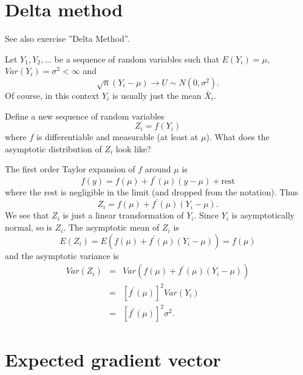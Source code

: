 \documentclass{article}
\begin{document}
\section{Delta method}

See also exercise ''Delta Method''.

Let $Y_{1},Y_{2},\ldots $ be a sequence of random variables such that $E(Y_i)=\mu$, $Var(Y_i) = \sigma^2 < \infty $ and
\begin{equation*}
\sqrt{n}\left( Y_{i}-\mu \right) \rightarrow U\sim N(0,\sigma ^{2}).
\end{equation*}
Of course, in this context $Y_{i}$ is usually just the mean $\bar{X}_{i}$.

Define a new sequence of random variables
\begin{equation*}
Z_{i}=f(Y_{i})
\end{equation*}%
where $f$ is differentiable and measurable (at least at $\mu$). What does the asymptotic distribution of $Z_{i}$ look like?

The first order Taylor expansion of $f$ around $\mu $ is
\begin{equation*}
f\left( y\right) =f\left( \mu \right) +f^{\prime }\left( \mu \right) \left(y-\mu \right) +\text{rest}
\end{equation*}
where the rest is negligible in the limit (and dropped from the notation). Thus
\begin{equation*}
Z_{i}=f\left( \mu \right) +f^{\prime }\left( \mu \right) \left( Y_{i}-\mu
\right) .
\end{equation*}%
We see that $Z_{i}$ is just a linear transformation of $Y_{i}$. Since $Y_{i}$ is asymptotically normal, so is $Z_{i}$. The asymptotic mean of $Z_{i}$ is
\begin{equation*}
E\left( Z_{i}\right) =E\left( f\left( \mu \right) +f^{\prime }\left( \mu \right) \left( Y_{i}-\mu \right) \right) = f\left( \mu \right)
\end{equation*}%
and the asymptotic variance is
\begin{eqnarray*}
Var\left( Z_{i}\right) &=&Var\left( f\left( \mu \right) +f^{\prime }\left(\mu \right) \left( Y_{i}-\mu \right) \right) \\
&=&\left[ f^{\prime }\left( \mu \right) \right] ^{2}Var\left( Y_{i}\right) \\
&= &\left[ f^{\prime }\left( \mu \right) \right] ^{2}\sigma ^{2}.
\end{eqnarray*}

\section{Expected gradient vector}
\end{document}
